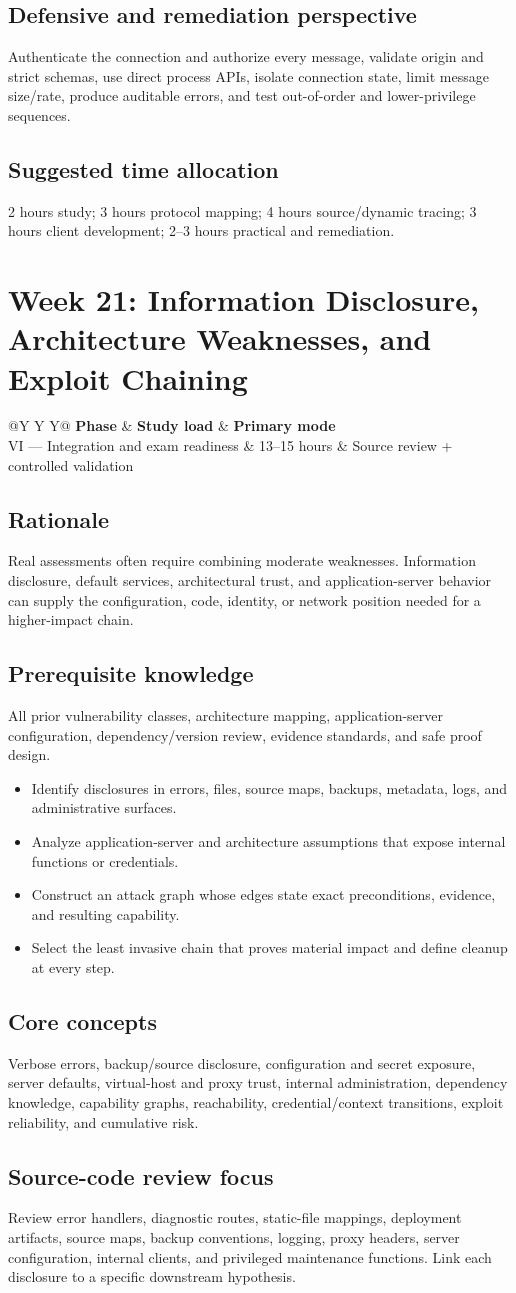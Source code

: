 \documentclass[11pt]{article}
\makeatletter
\newcommand{\weekheader}[4]{%
  \clearpage
  \section{Week #1: #2}
  \begin{tcolorbox}[colback=Navy,colframe=Navy,coltext=white]
    \begin{tabularx}{\linewidth}{@{}Y Y Y@{}}
      \textbf{Phase} & \textbf{Study load} & \textbf{Primary mode}\\
      #3 & #4 hours & Source review + controlled validation
    \end{tabularx}
  \end{tcolorbox}
}
\newcommand{\weekfield}[2]{%
  \Needspace{5\baselineskip}
  \subsection*{#1}
  #2
}
\makeatother
\begin{document}
\weekfield{Defensive and remediation perspective}{Authenticate the connection and
authorize every message, validate origin and strict schemas, use direct process
APIs, isolate connection state, limit message size/rate, produce auditable errors,
and test out-of-order and lower-privilege sequences.}

\weekfield{Suggested time allocation}{2 hours study; 3 hours protocol mapping; 4
hours source/dynamic tracing; 3 hours client development; 2--3 hours practical and
remediation.}

\weekheader{21}{Information Disclosure, Architecture Weaknesses, and Exploit Chaining}{VI --- Integration and exam readiness}{13--15}

\weekfield{Rationale}{Real assessments often require combining moderate
weaknesses. Information disclosure, default services, architectural trust, and
application-server behavior can supply the configuration, code, identity, or
network position needed for a higher-impact chain.}

\weekfield{Prerequisite knowledge}{All prior vulnerability classes, architecture
mapping, application-server configuration, dependency/version review, evidence
standards, and safe proof design.}

\begin{objectivebox}
\begin{itemize}
  \item Identify disclosures in errors, files, source maps, backups, metadata, logs, and administrative surfaces.
  \item Analyze application-server and architecture assumptions that expose internal functions or credentials.
  \item Construct an attack graph whose edges state exact preconditions, evidence, and resulting capability.
  \item Select the least invasive chain that proves material impact and define cleanup at every step.
\end{itemize}
\end{objectivebox}

\weekfield{Core concepts}{Verbose errors, backup/source disclosure, configuration
and secret exposure, server defaults, virtual-host and proxy trust, internal
administration, dependency knowledge, capability graphs, reachability,
credential/context transitions, exploit reliability, and cumulative risk.}

\weekfield{Source-code review focus}{Review error handlers, diagnostic routes,
static-file mappings, deployment artifacts, source maps, backup conventions,
logging, proxy headers, server configuration, internal clients, and privileged
maintenance functions. Link each disclosure to a specific downstream hypothesis.}
\end{document}

